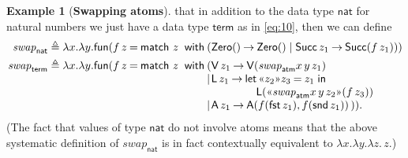 \documentclass{LMCS}
\theoremstyle{plain}
\theoremstyle{definition}
\newtheorem{example}[thm]{Example}
\newcommand{\ALT}{\mathrel{\kw{|}}}
\newcommand{\ATM}{\kw{atm}}
\newcommand{\BINDVAL}[2]{\mathopen{\text{\normalfont\guillemotleft}}#1
  \mathclose{\text{\normalfont\guillemotright}}#2}
\newcommand{\CON}[1][C]{\kw{#1}}
\newcommand{\defeq}{\triangleq}
\newcommand{\EQ}{\mathbin{\kw{=}}}
\newcommand{\FST}{\kw{fst}}
\newcommand{\FUN}{\kw{fun}}
\newcommand{\IN}{\mathrel{\kw{in}}}
\newcommand{\LET}{\mathop{\kw{let}}}
\newcommand{\kw}[1]{\mathsf{#1}}
\newcommand{\MATCH}{\kw{match}}
\newcommand{\NAT}{\kw{nat}}
\newcommand{\TERM}{\kw{term}}
\newcommand{\TO}{\mathbin{\rightarrow}}
\newcommand{\vid}[1][x]{#1}
\newcommand{\WITH}{\mathbin{\kw{with}}}
\begin{document}
\begin{example}[\textbf{Swapping atoms}]
  that in addition to the data type $\NAT$ for natural numbers we just
  have a data type $\TERM$ as in \eqref{eq:10}, then we can define
  \begin{align}
    \label{eq:74}
    \mathit{swap}_{\NAT} &\defeq \lambda \vid.\lambda \vid[y].
    \FUN(\vid[f]\,\vid[z] \EQ {\MATCH\ \vid[z]\ \WITH (\CON[Zero]()
      \TO \CON[Zero]() \ALT \CON[Succ]\,\vid[z]_1 \TO
      \CON[Succ](\vid[f]\,\vid[z]_1))})\\
    \label{eq:75}
    \mathit{swap}_{\TERM} &\defeq \lambda \vid.\lambda \vid[y].
    \FUN(\vid[f]\,\vid[z] \EQ \MATCH\ \vid[z]\ \WITH 
    \begin{array}[t]{@{}l@{}l}
      ( & \CON[V]\,\vid[z]_1 \TO 
      \CON[V](\mathit{swap}_{\ATM}\vid\,\vid[y]\,\vid[z]_1)\\
      \ALT & \CON[L]\,\vid[z]_1 \TO 
      \begin{array}[t]{@{}l}
        \LET {\BINDVAL{\vid[z]_2}{\vid[z]_3}\EQ \vid[z]_1} \IN \\
        \quad \CON[L](\BINDVAL{\mathit{swap}_{\ATM}\vid\,\vid[y]\,\vid[z]_2}
        {(f\,\vid[z]_3)})
      \end{array}\\
      \ALT & \CON[A]\,\vid[z]_1 \TO 
      \CON[A](f(\FST\,\vid[z]_1), f(\SND\,\vid[z]_1))\,)).       
      \end{array}
  \end{align}
  (The fact that values of type $\NAT$ do not involve atoms means that
  the above systematic definition of $\mathit{swap}_{\NAT}$ is in
  fact contextually equivalent to $\lambda \vid.\lambda \vid[y].
  \lambda \vid[z].\,\vid[z]$.)
\end{example}
\end{document}
